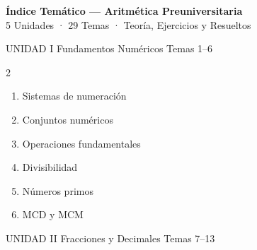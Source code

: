 
{
\hypersetup{linkcolor=AzulPizarra}
\tableofcontents
}
\newpage

\thispagestyle{fancy}

\begin{center}
  {\Large\sffamily\bfseries\color{AzulPizarra} Índice Temático — Aritmética Preuniversitaria}\\[4pt]
  {\small\sffamily\color{GrisMedio} 5 Unidades · 29 Temas · Teoría, Ejercicios y Resueltos}
\end{center}

\vspace{0.6cm}

\begin{tcolorbox}[enhanced, colback=AzulPizarra, colframe=DoradoAcadémico,
    arc=3pt, boxrule=1pt, left=8pt, right=8pt, top=5pt, bottom=5pt,
    fontupper=\sffamily\bfseries\color{white}]
  UNIDAD I \hfill Fundamentos Numéricos \hfill Temas 1–6
\end{tcolorbox}

\begin{multicols}{2}
  \begin{enumerate}[label=\textcolor{AzulPizarra}{\textbf{\arabic*.}},
      leftmargin=2em, itemsep=1pt]
    \item Sistemas de numeración
    \item Conjuntos numéricos
    \item Operaciones fundamentales
    \item Divisibilidad
    \item Números primos
    \item MCD y MCM
  \end{enumerate}
\end{multicols}

\vspace{0.4cm}

\begin{tcolorbox}[enhanced, colback=AzulMedio, colframe=DoradoAcadémico,
    arc=3pt, boxrule=1pt, left=8pt, right=8pt, top=5pt, bottom=5pt,
    fontupper=\sffamily\bfseries\color{white}]
  UNIDAD II \hfill Fracciones y Decimales \hfill Temas 7–13
\end{tcolorbox}

